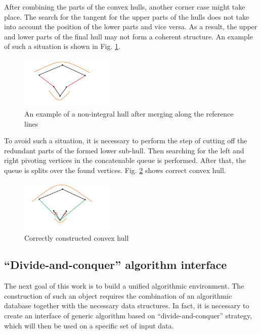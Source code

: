 \documentclass[sigconf]{acmart}
\begin{document}
		After combining the parts of the convex hulls, another corner case might take place. The search for the tangent for the upper parts of the hulls does not take into account the position of the lower parts and vice versa. As a result, the upper and lower parts of the final hull may not form a coherent structure. An example of such a situation is shown in Fig. \ref{fig:incorect_lower_subhull}.
		
		\begin{figure}[htbp]
			\centerline{\includegraphics[width=0.4\textwidth, height=0.2\textheight]{incorect_lower_subhull}}
			\caption{An example of a non-integral hull after merging along the reference lines}
			\label{fig:incorect_lower_subhull}
		\end{figure}
		
		To avoid such a situation, it is necessary to perform the step of cutting off the redundant parts of the formed lower sub-hull. Then searching for the left and right pivoting vertices in the concatenable queue is performed. After that, the queue is splits over the found vertices.
		Fig. \ref{fig:correct_convex_hull} shows correct convex hull.
		
		\begin{figure}[htbp]
			\centerline{\includegraphics[width=0.4\textwidth, height=0.2\textheight]{correct_convex_hull}}
			\caption{Correctly constructed convex hull}
			\label{fig:correct_convex_hull}
		\end{figure}
	
\subsection{``Divide-and-conquer'' algorithm interface}


		The next goal of this work is to build a unified algorithmic environment. The construction of such an object requires the combination of an algorithmic database together with the necessary data structures.  In fact, it is necessary to create an interface of generic algorithm based on ``divide-and-conquer'' strategy, which will then be used on a specific set of input data.
		
\end{document}
